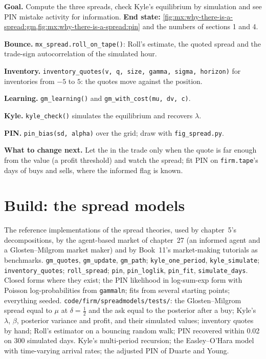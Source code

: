 \begin{tutorial}
\textbf{Goal.} Compute the three spreads, check Kyle's equilibrium by simulation and see PIN mistake activity for information.
\textbf{End state:} \cref{fig:mx:why-there-is-a-spread:gm,fig:mx:why-there-is-a-spread:pin} and the numbers of sections 1 and 4.
\begin{tutsteps}
\item \textbf{Bounce.} \texttt{mx\_spread.roll\_on\_tape()}: Roll's estimate, the quoted spread and the trade-sign autocorrelation of the simulated hour.
\item \textbf{Inventory.} \texttt{inventory\_quotes(v, q, size, gamma, sigma, horizon)} for inventories from $-5$ to $5$: the quotes move against the
position.
\item \textbf{Learning.} \texttt{gm\_learning()} and \texttt{gm\_with\_cost(mu, dv, c)}.
\item \textbf{Kyle.} \texttt{kyle\_check()} simulates the equilibrium and recovers $\lambda$.
\item \textbf{PIN.} \texttt{pin\_bias(sd, alpha)} over the grid; draw with \texttt{fig\_spread.py}.
\end{tutsteps}
\textbf{What to change next.} Let the  in the  trade only when the quote is far enough from the value (a profit
threshold) and watch the spread; fit PIN on \texttt{firm.tape}'s days of buys and sells, where the informed flag is known.
\end{tutorial}

\section{Build: the spread models}\label{bld:mx:why-there-is-a-spread:spreadmodels}

\begin{build}
 The reference implementations of the spread theories, used by chapter~5's decompositions, by the agent-based market of chapter~27
(an informed agent and a Glosten--Milgrom market maker) and by Book~11's market-making tutorials as benchmarks.
 \texttt{gm\_quotes}, \texttt{gm\_update}, \texttt{gm\_path}; \texttt{kyle\_one\_period}, \texttt{kyle\_simulate};
\texttt{inventory\_quotes}; \texttt{roll\_spread}; \texttt{pin}, \texttt{pin\_loglik}, \texttt{pin\_fit}, \texttt{simulate\_days}.
 Closed forms where they exist; the PIN likelihood in log-sum-exp form with Poisson log-probabilities from \texttt{gammaln}; fits from several
starting points; everything seeded.
 \texttt{code/firm/spreadmodels/tests/}: the Glosten--Milgrom spread equal to $\mu$ at $\delta=\tfrac12$ and the ask equal to the
posterior after a buy; Kyle's $\lambda$, $\beta$, posterior variance and profit, and their simulated values; inventory quotes by hand; Roll's estimator on
a bouncing random walk; PIN recovered within 0.02 on 300 simulated days.
 Kyle's multi-period recursion; the Easley--O'Hara model with time-varying arrival rates; the adjusted PIN of Duarte and Young.
\end{build}

